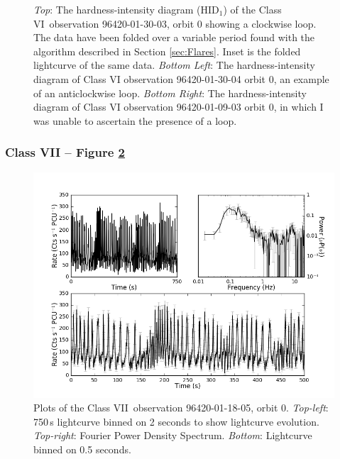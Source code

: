 \begin{figure}
    \captionsetup{singlelinecheck=off}
    \caption[The hardness-intensity diagram of the Class VI observation 96420-01-30-03, showing a clockwise loop.]{\textit{Top}: The hardness-intensity diagram (HID$_1$) of the Class VI\indexvi\ observation 96420-01-30-03, orbit 0 showing a clockwise loop.  The data have been folded over a variable period found with the algorithm described in Section \ref{sec:Flares}.  Inset is the folded lightcurve of the same data. \textit{Bottom Left}: The hardness-intensity diagram of Class VI observation 96420-01-30-04 orbit 0, an example of an anticlockwise loop.  \textit{Bottom Right}: The hardness-intensity diagram of Class VI observation 96420-01-09-03 orbit 0, in which I was unable to ascertain the presence of a loop.}
   \label{fig:LoopVI}
\end{figure}

\subsubsection{Class VII -- Figure \ref{fig:Nmulti}}

\begin{figure}
    \includegraphics[width=0.8\columnwidth, trim = 0.6cm 0 3.9cm 0]{images/Nmulti.png}
    \captionsetup{singlelinecheck=off}
    \caption[Characteristic lightcurves and a power spectrum of Type VII variability.]{Plots of the Class VII\indexvii\ observation 96420-01-18-05, orbit 0.  \textit{Top-left}: 750\,s lightcurve binned on 2 seconds to show lightcurve evolution.  \textit{Top-right}: Fourier Power Density Spectrum.  \textit{Bottom}: Lightcurve binned on 0.5 seconds.}
   \label{fig:Nmulti}
\end{figure}

